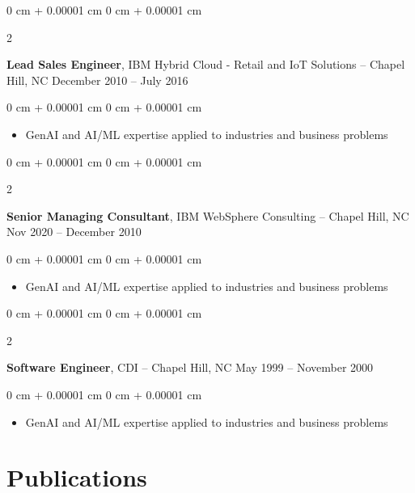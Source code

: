 \documentclass[10pt, letterpaper]{article}
\newenvironment{highlights}{
    \begin{itemize}[
        topsep=0.10 cm,
        parsep=0.10 cm,
        partopsep=0pt,
        itemsep=0pt,
        leftmargin=0 cm + 10pt
    ]
}{
    \end{itemize}
} %
\newenvironment{onecolentry}{
    \begin{adjustwidth}{
        0 cm + 0.00001 cm
    }{
        0 cm + 0.00001 cm
    }
}{
    \end{adjustwidth}
} %
\newenvironment{twocolentry}[2][]{
    \onecolentry
    \def\secondColumn{#2}
    \setcolumnwidth{\fill, 4.5 cm}
    \begin{paracol}{2}
}{
    \switchcolumn \raggedleft \secondColumn
    \end{paracol}
    \endonecolentry
} %
\begin{document}
        \begin{twocolentry}{
            December 2010 – July 2016
        }
            \textbf{Lead Sales Engineer}, IBM Hybrid Cloud - Retail and IoT Solutions -- Chapel Hill, NC\end{twocolentry}

        \vspace{0.10 cm}
        \begin{onecolentry}
            \begin{highlights}
                \item GenAI and AI/ML expertise applied to industries and business problems
            \end{highlights}
        \end{onecolentry}      
        
        \begin{twocolentry}{
            Nov 2020 – December 2010
        }
            \textbf{Senior Managing Consultant}, IBM WebSphere Consulting -- Chapel Hill, NC\end{twocolentry}

        \vspace{0.10 cm}
        \begin{onecolentry}
            \begin{highlights}
                \item GenAI and AI/ML expertise applied to industries and business problems
            \end{highlights}
        \end{onecolentry}      
        
        \begin{twocolentry}{
            May 1999 – November 2000
        }
            \textbf{Software Engineer}, CDI -- Chapel Hill, NC\end{twocolentry}

        \vspace{0.10 cm}
        \begin{onecolentry}
            \begin{highlights}
                \item GenAI and AI/ML expertise applied to industries and business problems
            \end{highlights}
        \end{onecolentry}             
   
    \section{Publications}
        
\end{document}
